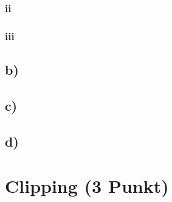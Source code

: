 \documentclass[a4paper,10pt,DIV=14]{article}
\begin{document}
\subsubsection{ii}
\subsubsection{iii}

\subsection{b)}
\subsection{c)}
\subsection{d)}

\section{Clipping (3 Punkt)}
\end{document}
